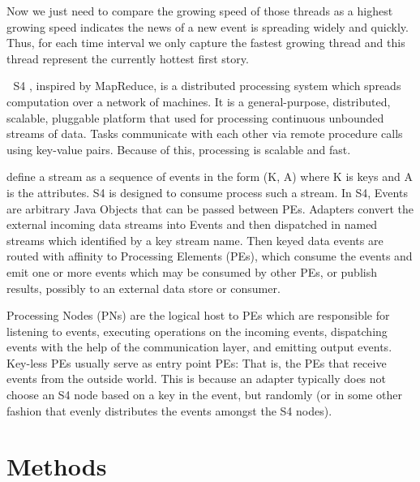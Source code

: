 \documentclass[a4paper,12pt]{article}
\begin{document}
Now we just need to compare the growing speed of those threads as a highest growing speed indicates the news of a new event is spreading widely and quickly. Thus, for each time interval we only capture the fastest growing thread and this thread represent the currently hottest first story. \newline











S4 , inspired by MapReduce, is a distributed processing system which spreads computation over a network of machines. It is a general-purpose, distributed, scalable, pluggable platform that used for processing continuous unbounded streams of data. Tasks communicate with each other via remote procedure calls using key-value pairs. Because of this, processing is scalable and fast. \newline



\citep{5693297} define a stream as a sequence of events in the form (K, A) where K is keys and A is the  attributes. S4 is designed to consume process such a stream. In S4, Events are arbitrary Java Objects that can be passed between PEs. Adapters convert the external incoming data streams into Events and then dispatched in named streams which identified by a key stream name. Then keyed data events are routed with affinity to Processing Elements (PEs), which consume the events and emit one or more events which may be consumed by other PEs, or publish results, possibly to an external data store or consumer.\newline

Processing Nodes (PNs) are the logical host to PEs which are responsible for listening to events, executing operations on the incoming events, dispatching events with the help of the communication layer, and emitting output events. Key-less PEs usually serve as entry point PEs: That is, the PEs that receive events from the outside world. This is because an adapter typically does not choose an S4 node based on a key in the event, but randomly (or in some other fashion that evenly distributes the events amongst the S4 nodes).\newline




\section{Methods}
\end{document}
